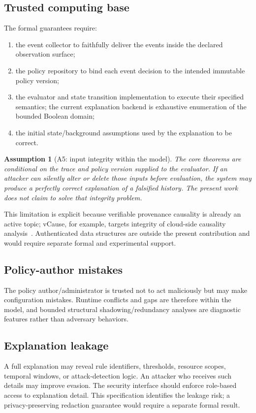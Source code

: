 \documentclass[11pt]{article}
\newtheorem{assumption}{Assumption}[section]
\theoremstyle{remark}
\begin{document}
\subsection{Trusted computing base}
The formal guarantees require:
\begin{enumerate}[label=(T\arabic*)]
\item the event collector to faithfully deliver the events inside the declared observation surface;
\item the policy repository to bind each event decision to the intended immutable policy version;
\item the evaluator and state transition implementation to execute their specified semantics; the current explanation backend is exhaustive enumeration of the bounded Boolean domain;
\item the initial state/background assumptions used by the explanation to be correct.
\end{enumerate}

\begin{assumption}[A5: input integrity within the model]
The core theorems are conditional on the trace and policy version supplied to the evaluator. If an attacker can silently alter or delete those inputs before evaluation, the system may produce a perfectly correct explanation of a falsified history. The present work does not claim to solve that integrity problem.
\end{assumption}

This limitation is explicit because verifiable provenance causality is already an active topic; vCause, for example, targets integrity of cloud-side causality analysis~\citep{Song2026VCause}. Authenticated data structures are outside the present contribution and would require separate formal and experimental support.

\subsection{Policy-author mistakes}
The policy author/administrator is trusted not to act maliciously but may make configuration mistakes. Runtime conflicts and gaps are therefore within the model, and bounded structural shadowing/redundancy analyses are diagnostic features rather than adversary behaviors.

\subsection{Explanation leakage}
A full explanation may reveal rule identifiers, thresholds, resource scopes, temporal windows, or attack-detection logic. An attacker who receives such details may improve evasion. The security interface should enforce role-based access to explanation detail. This specification identifies the leakage risk; a privacy-preserving redaction guarantee would require a separate formal result.
\end{document}

